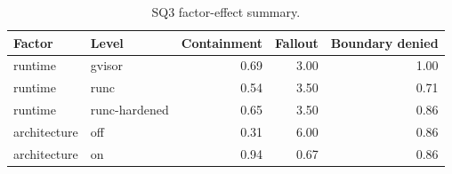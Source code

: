 \begin{table}[t]
\centering
\begin{tabular}{llrrr}
\toprule
Factor & Level & Containment & Fallout & Boundary denied \\
\midrule
runtime & gvisor & 0.69 & 3.00 & 1.00 \\
runtime & runc & 0.54 & 3.50 & 0.71 \\
runtime & runc-hardened & 0.65 & 3.50 & 0.86 \\
architecture & off & 0.31 & 6.00 & 0.86 \\
architecture & on & 0.94 & 0.67 & 0.86 \\
\bottomrule
\end{tabular}
\caption{SQ3 factor-effect summary.}
\label{tab:sq3-factor-effects}
\end{table}
